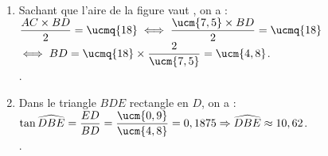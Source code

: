 \ \\ [-5mm]
\begin{enumerate}
   \item Sachant que l'aire de la figure vaut , on a : \\ [1mm]
   $\dfrac{AC\times BD}{2} =\ucmq{18} \iff \dfrac{\ucm{7,5}\times BD}{2} =\ucmq{18}$ \\
   \hspace*{2.9cm} $\iff BD =\ucmq{18}\times\dfrac{2}{\ucm{7,5}} = \ucm{4,8}$. \\
   .
   \item Dans le triangle $BDE$ rectangle en $D$, on a : \\ [1mm]
   $\tan{\widehat{DBE}} =\dfrac{ED}{BD} =\dfrac{\ucm{0,9}}{\ucm{4,8}} =0,1875 \Rightarrow \widehat{DBE} \approx 10,62$\degre. \\ [1mm]
   .
\end{enumerate}
